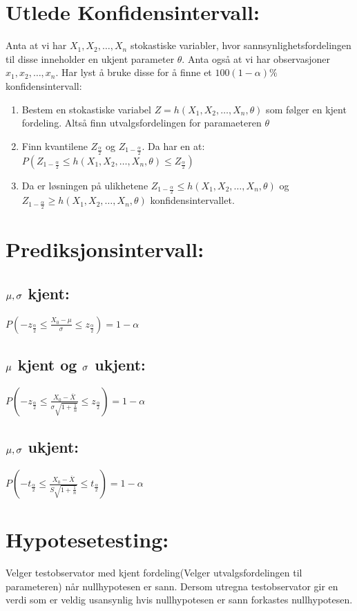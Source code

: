\documentclass[8pt,a4paper,twocolumn,twoside]{article}
\begin{document}
\section*{Utlede Konfidensintervall:}
Anta at vi har $X_1,X_2,\dots,X_n$ stokastiske variabler, hvor sannsynlighetsfordelingen til disse inneholder
en ukjent parameter $\theta$. Anta også at vi har observasjoner $x_1,x_2,\dots,x_n$. Har lyst å bruke disse 
for å finne et $100(1-\alpha)\%$ konfidensintervall:
\begin{enumerate}[topsep=0pt,itemsep=0pt, partopsep=0pt]
    \item Bestem en stokastiske variabel $Z = h(X_1,X_2,\dots,X_n,\theta)$ som følger en kjent fordeling. Altså finn
     utvalgsfordelingen for paramaeteren $\theta$
    \item Finn kvantilene $Z_{\frac{\alpha}{2}}$ og $Z_{1-\frac{\alpha}{2}}$. Da har en at: $P(Z_{1-\frac{\alpha}{2}}\leq h(X_1,X_2,\dots,X_n,\theta)\leq Z_{\frac{\alpha}{2}})$
    \item Da er løsningen på ulikhetene $Z_{1-\frac{\alpha}{2}} \leq h(X_1,X_2,\dots,X_n,\theta)$ og $Z_{1-\frac{\alpha}{2}}\geq h(X_1,X_2,\dots,X_n,\theta)$ konfidensintervallet.
\end{enumerate}
%
%
\section*{Prediksjonsintervall:}
\subsection*{$\bold{\mu,\sigma}$ kjent:}
$P\left(-z_{\frac{\alpha}{2}}\leq\frac{X_0-\mu}{\sigma}\leq z_{\frac{\alpha}{2}}\right) = 1-\alpha$
\subsection*{$\bold{\mu}$ kjent og $\bold{\sigma}$ ukjent:}
$P\left(-z_{\frac{\alpha}{2}}\leq\frac{X_0-\overline{X}}{\sigma\sqrt{1+\frac{1}{n}}}\leq z_{\frac{\alpha}{2}}\right) = 1-\alpha$
\subsection*{$\bold{\mu,\sigma}$ ukjent:}
$P\left(-t_{\frac{\alpha}{2}}\leq\frac{X_0-\overline{X}}{S\sqrt{1+\frac{1}{n}}}\leq t_{\frac{\alpha}{2}}\right) = 1-\alpha$

%
%
\section*{Hypotesetesting:}
Velger testobservator med kjent fordeling(Velger utvalgsfordelingen til parameteren) når nullhypotesen er sann.
Dersom utregna testobservator gir en verdi som er veldig usansynlig hvis nullhypotesen er sann forkastes nullhypotesen.
\end{document}
